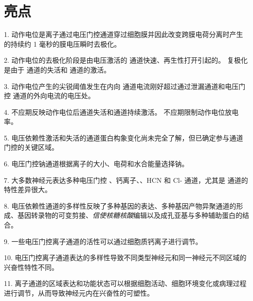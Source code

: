 \section{亮点}

1. 动作电位是离子通过电压门控通道穿过细胞膜并因此改变跨膜电荷分离时产生的持续约 1 毫秒的膜电压瞬时去极化。 


2. 动作电位的去极化阶段是由电压激活的  通道快速、再生性打开引起的。
复极化是由于  通道的失活和  通道的激活。 


3. 动作电位产生的尖锐阈值发生在内向  通道电流刚好超过通过泄漏通道和电压门控  通道的外向电流的电压处。


4. 不应期反映动作电位后通道失活和通道持续激活。
不应期限制动作电位放电率。 


5. 电压依赖性激活和失活的通道蛋白构象变化尚未完全了解，但已确定参与通道门控的关键区域。


6. 电压门控钠通道根据离子的大小、电荷和水合能量选择钠。


7. 大多数神经元表达多种电压门控 、钙离子、、HCN 和 Cl- 通道，尤其是  通道的特性差异很大。 


8. 电压依赖性通道的多样性反映了多种基因的表达、多种基因产物异聚通道的形成、基因转录物的可变剪接、\textit{信使核糖核酸}编辑以及成孔亚基与多种辅助蛋白的结合。


9. 一些电压门控离子通道的活性可以通过细胞质钙离子进行调节。


10. 电压门控离子通道表达的多样性导致不同类型神经元和同一神经元不同区域的兴奋性特性不同。


11. 离子通道的区域表达和功能状态可以根据细胞活动、细胞环境变化或病理过程进行调节，从而导致神经元内在兴奋性的可塑性。


